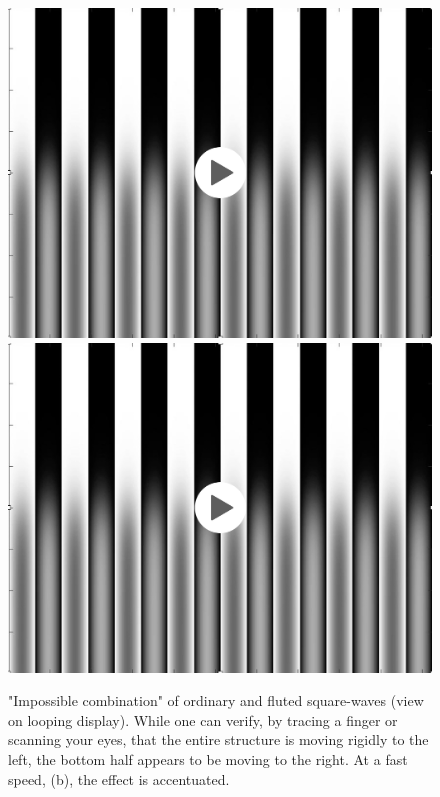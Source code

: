 \begin{figure}
    \centerline{
        {
            \href{https://groups.csail.mit.edu/vision/cvbook/videos/blendedSlowLoop.mov}{\includegraphics[width=0.2\linewidth]{figures/temporal_filters/blendFrame.jpg}}}
        {
            \href{https://groups.csail.mit.edu/vision/cvbook/videos/fastBlendLoop.mov}{\includegraphics[width=0.2\linewidth]{figures/temporal_filters/blendFrame.jpg}}}
    }
    \caption{"Impossible combination" of ordinary and  fluted square-waves (view on looping display).  While one can verify, by tracing a finger or scanning your eyes, that the entire structure is moving rigidly to the left, the bottom half appears to be moving to the right.  At a fast speed, (b), the effect is accentuated.}
    \label{fig:blends}
\end{figure}



%
%
%
%


